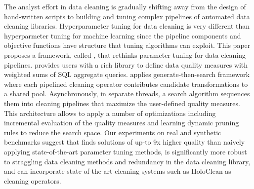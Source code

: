\sloppy
The analyst effort in data cleaning is gradually shifting away from the design of hand-written scripts to building and tuning complex pipelines of automated data cleaning libraries.
Hyperparameter tuning for data cleaning is very different than hyperparmeter tuning for machine learning since the pipeline components and objective functions have structure that tuning algorithms can exploit.
This paper proposes a framework, called \sys, that rethinks parameter tuning for data cleaning pipelines.
\sys provides users with a rich library to define data quality measures with weighted sums of SQL aggregate queries.
\sys applies generate-then-search framework where each pipelined cleaning operator contributes candidate transformations to a shared pool.  Asynchronously, in separate threads, a search algorithm sequences them into cleaning pipelines that maximize the user-defined quality measures.
This architecture allows \sys to apply a number of optimizations including incremental evaluation of the quality measures and learning dynamic pruning rules to reduce the search space.
Our experiments on real and synthetic benchmarks suggest that \sys finds solutions of up-to 9x higher quality than naively applying state-of-the-art parameter tuning methods, is significantly more robust to straggling data cleaning methods and redundancy in the data cleaning library, and can incorporate state-of-the-art cleaning systems such as HoloClean as cleaning operators.